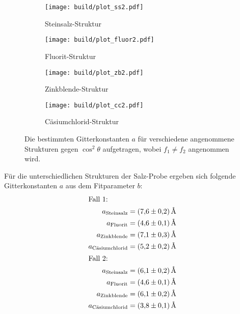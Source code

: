 \begin{figure}[hhh]
  \centering
  \begin{subfigure}{.45\textwidth}
    \centering
    \texttt{[image: build/plot\_ss2.pdf]}
    \caption{Steinsalz-Struktur}
    \label{subfig:ss2}
  \end{subfigure}
  \begin{subfigure}{.45\textwidth}
    \centering
    \texttt{[image: build/plot\_fluor2.pdf]}
    \caption{Fluorit-Struktur}
    \label{subfig:fluo2}
  \end{subfigure}
  \begin{subfigure}{.45\textwidth}
    \centering
    \texttt{[image: build/plot\_zb2.pdf]}
    \caption{Zinkblende-Struktur}
    \label{subfig:zb2}
  \end{subfigure}
  \begin{subfigure}{.45\textwidth}
    \centering
    \texttt{[image: build/plot\_cc2.pdf]}
    \caption{Cäsiumchlorid-Struktur}
    \label{subfig:cc2}
  \end{subfigure}
  \caption{Die bestimmten Gitterkonstanten $a$ für verschiedene angenommene Strukturen gegen $\cos^2\theta$ aufgetragen, wobei
  $f_1\neq f_2$ angenommen wird.}
  \label{fig:salz2}
\end{figure}
\FloatBarrier
Für die unterschiedlichen Strukturen der Salz-Probe ergeben sich folgende Gitterkonstanten $a$
aus dem Fitparameter $b$:
\begin{align*}
\intertext{Fall 1:}
a_{\text{Steinsalz}}&=\SI{7.6(2)}{\angstrom}\\
a_{\text{Fluorit}}&=\SI{4.6(1)}{\angstrom}\\
a_{\text{Zinkblende}}&=\SI{7.1(3)}{\angstrom}\\
a_{\text{Cäsiumchlorid}} &=\SI{5.2(2)}{\angstrom}\\
\intertext{Fall 2:}
a_{\text{Steinsalz}}&=\SI{6.1(2)}{\angstrom}\\
a_{\text{Fluorit}}&=\SI{4.6(1)}{\angstrom}\\
a_{\text{Zinkblende}}&=\SI{6.1(2)}{\angstrom}\\
a_{\text{Cäsiumchlorid}} &=\SI{3.8(1)}{\angstrom}
\end{align*}
